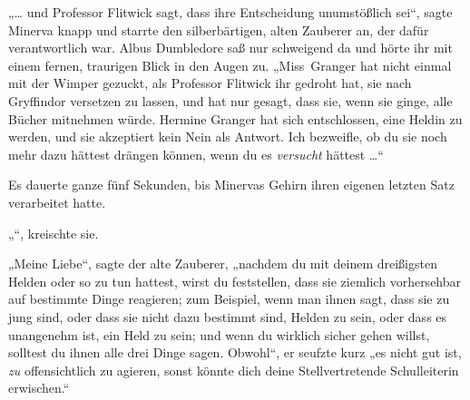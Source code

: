 
„… und Professor Flitwick sagt, dass ihre Entscheidung unumstößlich sei“, sagte Minerva knapp und starrte den silberbärtigen, alten Zauberer an, der dafür verantwortlich war. Albus Dumbledore saß nur schweigend da und hörte ihr mit einem fernen, traurigen Blick in den Augen zu.
„Miss~Granger hat nicht einmal mit der Wimper gezuckt, als Professor Flitwick ihr gedroht hat, sie nach Gryffindor versetzen zu lassen, und hat nur gesagt, dass sie, wenn sie ginge, alle Bücher mitnehmen würde. Hermine Granger hat sich entschlossen, eine Heldin zu werden, und sie akzeptiert kein Nein als Antwort. Ich bezweifle, ob du sie noch mehr dazu hättest drängen können, wenn du es \emph{versucht} hättest …“

Es dauerte ganze fünf Sekunden, bis Minervas Gehirn ihren eigenen letzten Satz verarbeitet hatte.

„“, kreischte sie.

„Meine Liebe“, sagte der alte Zauberer, „nachdem du mit deinem dreißigsten Helden oder so zu tun hattest, wirst du feststellen, dass sie ziemlich vorhersehbar auf bestimmte Dinge reagieren; zum Beispiel, wenn man ihnen sagt, dass sie zu jung sind, oder dass sie nicht dazu bestimmt sind, Helden zu sein, oder dass es unangenehm ist, ein Held zu sein; und wenn du wirklich sicher gehen willst, solltest du ihnen alle drei Dinge sagen. Obwohl“, er seufzte kurz „es nicht gut ist, \emph{zu} offensichtlich zu agieren, sonst könnte dich deine Stellvertretende Schulleiterin erwischen.“

